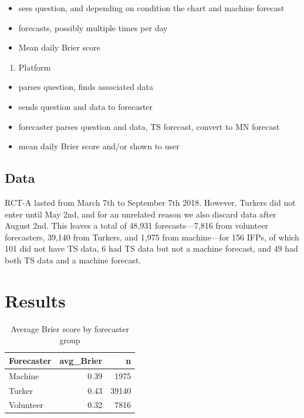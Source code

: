 \documentclass[]{article}
\providecommand{\tightlist}{%
  \setlength{\itemsep}{0pt}\setlength{\parskip}{0pt}}
\begin{document}
\begin{itemize}
\tightlist
\item
  sees question, and depending on condition the chart and machine
  forecast
\item
  forecasts, possibly multiple times per day
\item
  Mean daily Brier score
\end{itemize}

\begin{enumerate}
\def\labelenumi{\arabic{enumi}.}
\setcounter{enumi}{1}
\tightlist
\item
  Platform
\end{enumerate}

\begin{itemize}
\tightlist
\item
  parses question, finds associated data
\item
  sends question and data to forecaster
\item
  forecaster parses question and data, TS forecast, convert to MN
  forecast
\item
  mean daily Brier score and/or shown to user
\end{itemize}

\subsection{Data}\label{data}

RCT-A lasted from March 7th to September 7th 2018. However, Turkers did
not enter until May 2nd, and for an unrelated reason we also discard
data after August 2nd. This leaves a total of 48,931 forecasts---7,816
from volunteer forecasters, 39,140 from Turkers, and 1,975 from
machine---for 156 IFPs, of which 101 did not have TS data, 6 had TS data
but not a machine forecast, and 49 had both TS data and a machine
forecast.

\section{Results}\label{results}

\begin{table}

\caption{\label{tab:brier-by-forecaster}Average Brier score by forecaster group}
\centering
\begin{tabular}[t]{lrr}
\toprule
Forecaster & avg\_Brier & n\\
\midrule
Machine & 0.39 & 1975\\
Turker & 0.43 & 39140\\
Volunteer & 0.32 & 7816\\
\bottomrule
\end{tabular}
\end{table}
\end{document}

